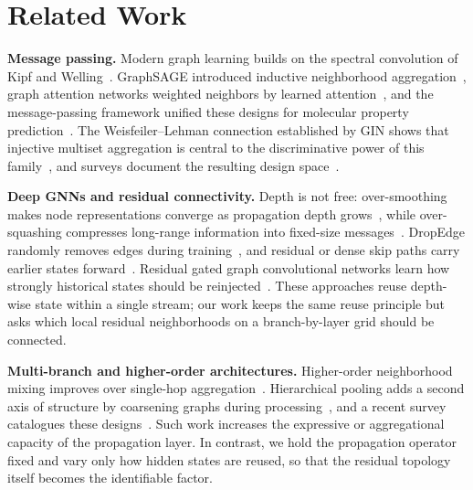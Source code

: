 \section{Related Work}
\label{sec:related}

\textbf{Message passing.} Modern graph learning builds on the spectral
convolution of Kipf and Welling~\cite{kipf2017gcn}. GraphSAGE introduced
inductive neighborhood aggregation~\cite{hamilton2017inductive}, graph attention
networks weighted neighbors by learned attention~\cite{velivckovic2017graph},
and the message-passing framework unified these designs for molecular property
prediction~\cite{gilmer2017neural}. The Weisfeiler--Lehman connection
established by GIN shows that injective multiset aggregation is central to the
discriminative power of this family~\cite{xu2019gin}, and surveys document the
resulting design space~\cite{wu2020comprehensive}.

\textbf{Deep GNNs and residual connectivity.} Depth is not free: over-smoothing
makes node representations converge as propagation depth
grows~\cite{li2018deeper}, while over-squashing compresses
long-range information into fixed-size
messages~\cite{alon2020bottleneck,topping2021understanding}. DropEdge randomly
removes edges during training~\cite{rong2019dropedge}, and residual or dense
skip paths carry earlier states
forward~\cite{he2016deep}. Residual gated graph convolutional
networks learn how strongly historical states should be
reinjected~\cite{bresson2017residual}. These approaches reuse depth-wise state
within a single stream; our work keeps the same reuse principle but asks which
local residual neighborhoods on a branch-by-layer grid should be connected.

\textbf{Multi-branch and higher-order architectures.} Higher-order neighborhood
mixing improves over single-hop aggregation~\cite{abu2019mixhop}. Hierarchical
pooling adds a second axis of structure by coarsening graphs during
processing~\cite{ying2018hierarchical}, and a recent survey
catalogues these designs~\cite{li2024graph}. Such work increases the expressive
or aggregational capacity of the propagation layer. In contrast, we hold the
propagation operator fixed and vary only how hidden states are reused, so that
the residual topology itself becomes the identifiable factor.
